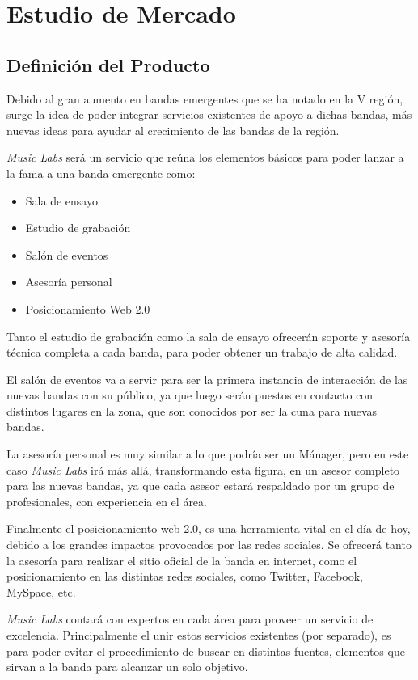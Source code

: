 \section{Estudio de Mercado}

\subsection{Definición del Producto}

Debido al gran aumento en  bandas emergentes que se ha notado en la V región,
surge la idea de poder integrar servicios existentes de apoyo a dichas bandas,
más nuevas ideas para ayudar al crecimiento de las bandas de la región.

\emph{Music Labs} será un servicio que reúna los elementos básicos para poder lanzar
a la fama a una banda emergente como:
\begin{itemize}
	\item Sala de ensayo
	\item Estudio de grabación
	\item Salón de eventos
	\item Asesoría personal
	\item Posicionamiento Web 2.0
\end{itemize}

Tanto el estudio de grabación como la sala de ensayo ofrecerán soporte y asesoría
técnica completa a cada banda, para poder obtener un trabajo de alta calidad.


El salón de eventos va a servir para ser la primera instancia de interacción de
las nuevas bandas con su público, ya que luego serán puestos en contacto con
distintos lugares en la zona, que son conocidos por ser la cuna para nuevas bandas.

La asesoría personal es muy similar a lo que podría ser un Mánager,
pero en este caso \emph{Music Labs} irá más allá, transformando esta figura,
en un asesor completo para las nuevas bandas,
ya que cada asesor estará respaldado por un grupo de profesionales, con experiencia en el área.

Finalmente el posicionamiento web 2.0, es una herramienta vital en el día de hoy,
debido a los grandes impactos provocados por las redes sociales.
Se ofrecerá tanto la asesoría para realizar el sitio oficial de la banda en internet,
como el posicionamiento en las distintas redes sociales, como Twitter, Facebook, MySpace, etc.

\emph{Music Labs} contará con expertos en cada área para proveer un servicio de excelencia.
Principalmente el unir estos servicios existentes (por separado),
es para poder evitar el procedimiento de buscar en distintas fuentes,
elementos que sirvan a la banda para alcanzar un solo objetivo.

